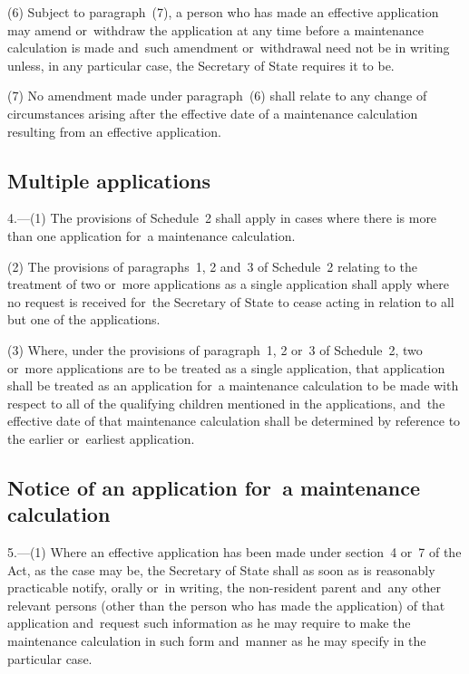 \documentclass[12pt,a4paper]{article}
\begin{document}
(6) Subject to paragraph~(7), a person who has made an effective application may amend or~withdraw the application at any time before a maintenance calculation is made and~such amendment or~withdrawal need not be in writing unless, in any particular case, the Secretary of State requires it to be.

(7) No amendment made under paragraph~(6) shall relate to any change of circumstances arising after the effective date of a maintenance calculation resulting from an effective application.

\vfill

\subsection[4. Multiple applications]{Multiple applications}

4.---(1)  The provisions of Schedule~2 shall apply in cases where there is more than one application for~a maintenance calculation.

(2) The provisions of paragraphs~1, 2 and~3 of Schedule~2 relating to the treatment of two or~more applications as a single application shall apply where no request is received for~the Secretary of State to cease acting in relation to all but one of the applications.

(3) Where, under the provisions of paragraph~1, 2 or~3 of Schedule~2, two or~more applications are to be treated as a single application, that application shall be treated as an application for~a maintenance calculation to be made with respect to all of the qualifying children mentioned in the applications, and~the effective date of that maintenance calculation shall be determined by reference to the earlier or~earliest application.

\subsection[5. Notice of an application for~a maintenance calculation]{Notice of an application for~a maintenance calculation}

5.---(1)  Where an effective application has been made under section~4 or~7 of the Act, 
as the case may be, the Secretary of State shall as soon as is reasonably practicable notify, orally or~in writing, the non-resident parent and~any other relevant persons (other than the person who has made
the application) of that application and~request such information as he may require to make the maintenance calculation in such form and~manner as he may specify in the particular case.
\end{document}
